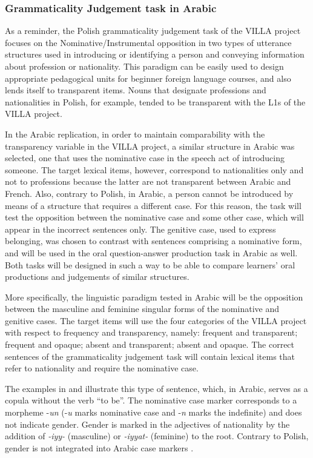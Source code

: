 \documentclass[output=paper,colorlinks,citecolor=brown,modfonts,nonflat]{../langscibook}
\begin{document}
\subsubsection{Grammaticality Judgement task in Arabic}\label{sec:watorek:4.2.1}

As a reminder, the Polish grammaticality judgement task of the VILLA project focuses on the Nominative/Instrumental opposition in two types of utterance structures used in introducing or identifying a person and conveying information about profession or nationality. This paradigm can be easily used to design appropriate pedagogical units for beginner foreign language courses, and also lends itself to transparent items. Nouns that designate professions and nationalities in Polish, for example, tended to be transparent with the L1s of the VILLA project. 

In the Arabic replication, in order to maintain comparability with the transparency variable in the VILLA project, a similar structure in Arabic was selected, one that uses the nominative case in the speech act of introducing someone. The target lexical items, however, correspond to nationalities only and not to professions because the latter are not transparent between Arabic and French. Also, contrary to Polish, in Arabic, a person cannot be introduced by means of a structure that requires a different case. For this reason, the task will test the opposition between the nominative case and some other case, which will appear in the incorrect sentences only. The genitive case, used to express belonging, was chosen to contrast with sentences comprising a nominative form, and will be used in the oral question-answer production task in Arabic as well. Both tasks will be designed in such a way to be able to compare learners’ oral productions and judgements of similar structures. 

More specifically, the linguistic paradigm tested in Arabic will be the opposition between the masculine and feminine singular forms of the nominative and genitive cases. The target items will use the four categories of the VILLA project with respect to frequency and transparency, namely: frequent and transparent; frequent and opaque; absent and transparent; absent and opaque. The correct sentences of the grammaticality judgement task will contain lexical items that refer to nationality and require the nominative case. 

The examples in  and  illustrate this type of sentence, which, in Arabic, serves as a copula without the verb “to be”. The nominative case marker corresponds to a morpheme -\textit{un} (-\textit{u} marks nominative case and -\textit{n} marks the indefinite) and does not indicate gender. Gender is marked in the adjectives of nationality by the addition of \textit{-iyy-} (masculine) or \textit{-iyyat-} (feminine) to the root. Contrary to Polish, gender is not integrated into Arabic case markers \citep{Kouloughli2007}.
\end{document}
